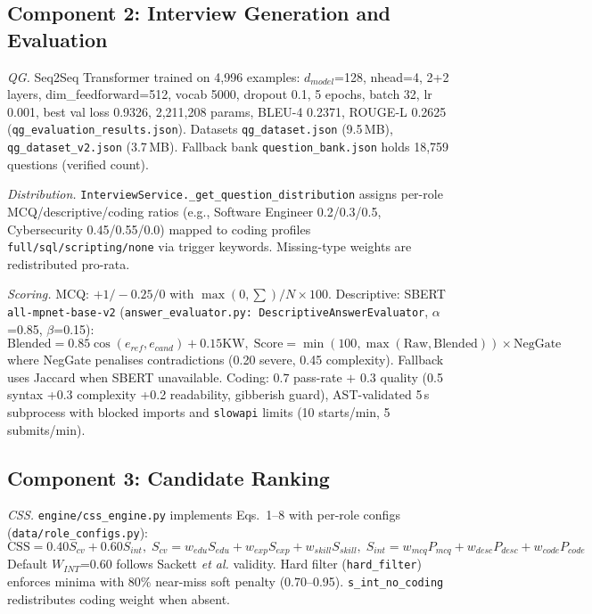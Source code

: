 \documentclass[conference]{IEEEtran}
\begin{document}
\subsection{Component 2: Interview Generation and Evaluation}
\textit{QG.} Seq2Seq Transformer trained on 4,996 examples: $d_{model}$=128, nhead=4, 2+2 layers, dim\_feedforward=512, vocab 5000, dropout 0.1, 5 epochs, batch 32, lr 0.001, best val loss 0.9326, 2,211,208 params, BLEU-4 0.2371, ROUGE-L 0.2625 (\texttt{qg\_evaluation\_results.json}). Datasets \texttt{qg\_dataset.json} (9.5\,MB), \texttt{qg\_dataset\_v2.json} (3.7\,MB). Fallback bank \texttt{question\_bank.json} holds 18,759 questions (verified count).

\textit{Distribution.} \texttt{InterviewService.\_get\_question\_distribution} assigns per-role MCQ/descriptive/coding ratios (e.g., Software Engineer 0.2/0.3/0.5, Cybersecurity 0.45/0.55/0.0) mapped to coding profiles \texttt{full/sql/scripting/none} via trigger keywords. Missing-type weights are redistributed pro-rata.

\textit{Scoring.} MCQ: $+1/-0.25/0$ with $\max(0,\sum)/N\times100$. Descriptive: SBERT \texttt{all-mpnet-base-v2} (\texttt{answer\_evaluator.py: DescriptiveAnswerEvaluator}, $\alpha$=0.85, $\beta$=0.15):
\begin{equation}
\text{Blended}=0.85\cos(e_{ref},e_{cand})+0.15\text{KW},\; \text{Score}=\min(100,\max(\text{Raw},\text{Blended}))\times\text{NegGate}
\end{equation}
where NegGate penalises contradictions (0.20 severe, 0.45 complexity). Fallback uses Jaccard when SBERT unavailable. Coding: $0.7$ pass-rate $+$ $0.3$ quality (0.5 syntax +0.3 complexity +0.2 readability, gibberish guard), AST-validated 5\,s subprocess with blocked imports and \texttt{slowapi} limits (10 starts/min, 5 submits/min).

\subsection{Component 3: Candidate Ranking}
\textit{CSS.} \texttt{engine/css\_engine.py} implements Eqs.~1--8 with per-role configs (\texttt{data/role\_configs.py}):
\begin{equation}
\text{CSS}=0.40S_{cv}+0.60S_{int},\; S_{cv}=w_{edu}S_{edu}+w_{exp}S_{exp}+w_{skill}S_{skill},\; S_{int}=w_{mcq}P_{mcq}+w_{desc}P_{desc}+w_{code}P_{code}
\end{equation}
Default $W_{INT}$=0.60 follows Sackett \textit{et al.} validity. Hard filter (\texttt{hard\_filter}) enforces minima with 80\% near-miss soft penalty (0.70--0.95). \texttt{s\_int\_no\_coding} redistributes coding weight when absent.
\end{document}

